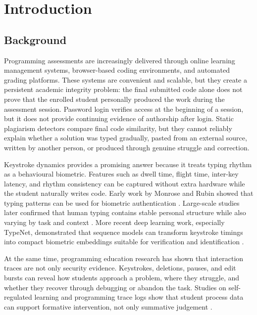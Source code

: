 \chapter{Introduction}
\label{chap:introduction}

\section{Background}
\label{sec:background}

Programming assessments are increasingly delivered through online learning management systems, browser-based coding environments, and automated grading platforms. These systems are convenient and scalable, but they create a persistent academic integrity problem: the final submitted code alone does not prove that the enrolled student personally produced the work during the assessment session. Password login verifies access at the beginning of a session, but it does not provide continuing evidence of authorship after login. Static plagiarism detectors compare final code similarity, but they cannot reliably explain whether a solution was typed gradually, pasted from an external source, written by another person, or produced through genuine struggle and correction.

Keystroke dynamics provides a promising answer because it treats typing rhythm as a behavioural biometric. Features such as dwell time, flight time, inter-key latency, and rhythm consistency can be captured without extra hardware while the student naturally writes code. Early work by Monrose and Rubin showed that typing patterns can be used for biometric authentication \cite{monrose2000keystroke}. Large-scale studies later confirmed that human typing contains stable personal structure while also varying by task and context \cite{dhakal2018observations}. More recent deep learning work, especially TypeNet, demonstrated that sequence models can transform keystroke timings into compact biometric embeddings suitable for verification and identification \cite{acien2022typenet}.

At the same time, programming education research has shown that interaction traces are not only security evidence. Keystrokes, deletions, pauses, and edit bursts can reveal how students approach a problem, where they struggle, and whether they recover through debugging or abandon the task. Studies on self-regulated learning and programming trace logs show that student process data can support formative intervention, not only summative judgement \cite{arakawa2021situ,dong2021trace}.

